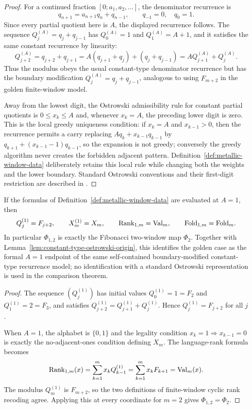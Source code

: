 \begin{proof}
For a continued fraction $[0;a_1,a_2,\ldots]$, the denominator recurrence is
\[
q_{n+1}=a_{n+1}q_n+q_{n-1},
\qquad q_{-1}=0,\quad q_0=1 .
\]
Since every partial quotient here is $A$, the displayed recurrence follows.
The sequence
$Q_j^{(A)}=q_j+q_{j-1}$ has $Q_0^{(A)}=1$ and $Q_1^{(A)}=A+1$, and it satisfies
the same constant recurrence by linearity:
\[
Q_{j+2}^{(A)}
=q_{j+2}+q_{j+1}
=A(q_{j+1}+q_j)+(q_j+q_{j-1})
=AQ_{j+1}^{(A)}+Q_j^{(A)}.
\]
Thus the modulus obeys the usual constant-type denominator recurrence but has
the boundary modification $Q_j^{(A)}=q_j+q_{j-1}$, analogous to using
$F_{m+2}$ in the golden finite-window model.

Away from the lowest digit, the Ostrowski admissibility rule for constant
partial quotients is $0\le x_k\le A$ and, whenever $x_k=A$, the preceding
lower digit is zero.  This is the local greedy uniqueness condition: if
$x_k=A$ and $x_{k-1}>0$, then the recurrence permits a carry replacing
$Aq_k+x_{k-1}q_{k-1}$ by $q_{k+1}+(x_{k-1}-1)q_{k-1}$, so the expansion is not
greedy; conversely the greedy algorithm never creates the forbidden adjacent
pattern.  Definition~\ref{def:metallic-window-data} deliberately retains this
local rule while changing both the weights and the lower boundary.  Standard
Ostrowski conventions and their first-digit restriction are described in
\cite{HieronymiTerry2018}.
\end{proof}

\begin{lemma}\label{lem:metallic-golden-member}
If the formulas of Definition~\ref{def:metallic-window-data} are evaluated at
$A=1$, then
\[
Q_j^{(1)}=F_{j+2},\qquad
X_m^{(1)}=X_m,\qquad
\operatorname{Rank}_{1,m}=\mathrm{Val}_m,\qquad
\mathrm{Fold}_{1,m}=\mathrm{Fold}_m.
\]
In particular $\Phi_{1,2}$ is exactly the Fibonacci two-window map $\Phi_2$.
Together with Lemma~\ref{lem:constant-type-ostrowski-origin}, this identifies
the golden case as the formal $A=1$ endpoint of the same self-contained
boundary-modified constant-type recurrence model; no identification with a
standard Ostrowski representation is used in the comparison theorem.
\end{lemma}

\begin{proof}
The sequence $(Q_j^{(1)})$ has initial values $Q_0^{(1)}=1=F_2$ and
$Q_1^{(1)}=2=F_3$, and satisfies
$Q_{j+2}^{(1)}=Q_{j+1}^{(1)}+Q_j^{(1)}$.  Hence
$Q_j^{(1)}=F_{j+2}$ for all $j$.

When $A=1$, the alphabet is $\{0,1\}$ and the legality condition
$x_k=1\Rightarrow x_{k-1}=0$ is exactly the no-adjacent-ones condition
defining $X_m$.  The language-rank formula becomes
\[
\operatorname{Rank}_{1,m}(x)=\sum_{k=1}^m x_kQ_{k-1}^{(1)}
=\sum_{k=1}^m x_kF_{k+1}=\mathrm{Val}_m(x).
\]
The modulus $Q_m^{(1)}$ is $F_{m+2}$, so the two definitions of finite-window
cyclic rank recoding agree.  Applying this at every coordinate for $m=2$ gives
$\Phi_{1,2}=\Phi_2$.
\end{proof}

